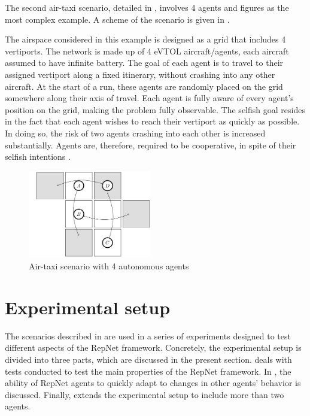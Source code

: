 The second air-taxi scenario, detailed in , involves 4 agents and figures as the most complex example. A scheme of the scenario is given in .


\begin{example}
\label{ex:air2}
The airspace considered in this example is designed as a grid that includes 4 vertiports. The network is made up of 4 eVTOL aircraft/agents, each aircraft assumed to have infinite battery. The goal of each agent is to travel to their assigned vertiport along a fixed itinerary, without crashing into any other aircraft. At the start of a run, these agents are randomly placed on the grid somewhere along their axis of travel. Each agent is fully aware of every agent's position on the grid, making the problem fully observable. The selfish goal resides in the fact that each agent wishes to reach their vertiport as quickly as possible. In doing so, the risk of two agents crashing into each other is increased substantially. Agents are, therefore, required to be cooperative, in spite of their selfish intentions \cite{2590}.

\end{example}


\begin{figure}[h]
  \begin{center}
    \includegraphics[width=0.48\textwidth]{images/MasterThesisVTOL4Draw (2).pdf}
  \end{center}
  \caption{Air-taxi scenario with 4 autonomous agents}\label{fig:ex4}
\end{figure}


\section{Experimental setup}
\label{sec:expset}
The scenarios described in  are used in a series of experiments designed to test different aspects of the RepNet framework. Concretely, the experimental setup is divided into three parts, which are discussed in the present section.  deals with tests conducted to test the main properties of the RepNet framework. In , the ability of RepNet agents to quickly adapt to changes in other agents' behavior is discussed. Finally,  extends the experimental setup to include more than two agents.

